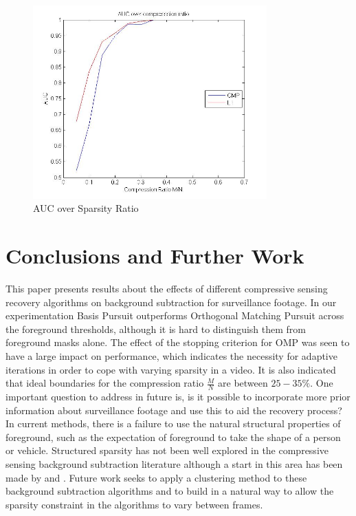 \documentclass[conference]{IEEEtran}
\begin{document}
\begin{figure}[t]
  \centering
  \includegraphics[width = 9cm]{AUCcompressionRatio}
  \caption{AUC over Sparsity Ratio}
  \label{fig:sr}
\end{figure}


\section{Conclusions and Further Work}\label{sec:conclusions}
This paper presents results about the effects of different compressive sensing recovery algorithms on background subtraction for surveillance footage. In our experimentation Basis Pursuit outperforms Orthogonal Matching Pursuit across the foreground thresholds, although it is hard to distinguish them from foreground masks alone.  The effect of the stopping criterion for OMP was seen to have a large impact on performance, which indicates the necessity for adaptive iterations in order to cope with varying sparsity in a video. It is also indicated that ideal boundaries for the compression ratio $\frac{M}{N}$ are between $25 - 35\%$.  One important question to address in future is, is it possible to incorporate more prior information about surveillance footage and use this to aid the recovery process? In current methods, there is a failure to use the natural structural properties of foreground, such as the expectation of foreground to take the shape of a person or vehicle. Structured sparsity has not been well explored in the compressive sensing background subtraction literature although a start in this area has been made by \cite{La2006} and \cite{Duarte2008}. Future work seeks to apply a clustering method to these background subtraction algorithms and to build in a natural way to allow the sparsity constraint in the algorithms to vary between frames. 
\end{document}
